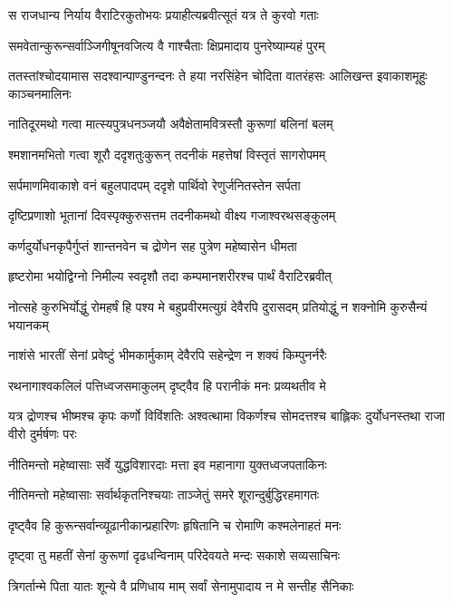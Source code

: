 \twolineshloka
{स राजधान्य निर्याय वैराटिरकुतोभयः}
{प्रयाहीत्यब्रवीत्सूतं यत्र ते कुरवो गताः}


\twolineshloka
{समवेतान्कुरून्सर्वाञ्जिगीषूनवजित्य वै}
{गाश्चैताः क्षिप्रमादाय पुनरेष्याम्यहं पुरम्}


\onelineshloka
{ततस्तांश्चोदयामास सदश्वान्पाण्डुनन्दनः}
\twolineshloka
{ते हया नरसिंहेन चोदिता वातरंहसः}
{आलिखन्त इवाकाशमूहुः काञ्चनमालिनः}


\twolineshloka
{नातिदूरमथो गत्वा मात्स्यपुत्रधनञ्जयौ}
{अवैक्षेतामवित्रस्तौ कुरूणां बलिनां बलम्}


\twolineshloka
{श्मशानमभितो गत्वा शूरौ ददृशतुःकुरून्}
{तदनीकं महत्तेषां विस्तृतं सागरोपमम्}


\twolineshloka
{सर्पमाणमिवाकाशे वनं बहुलपादपम्}
{ददृशे पार्थिवो रेणुर्जनितस्तेन सर्पता}


\twolineshloka
{दृष्टिप्रणाशो भूतानां दिवस्पृक्कुरुसत्तम}
{तदनीकमथो वीक्ष्य गजाश्वरथसङ्कुलम्}


\twolineshloka
{कर्णदुर्योधनकृपैर्गुप्तं शान्तनवेन च}
{द्रोणेन सह पुत्रेण महेष्वासेन धीमता}


\twolineshloka
{हृष्टरोमा भयोद्विग्नो निमील्य स्वदृशौ तदा}
{कम्पमानशरीरश्च पार्थं वैराटिरब्रवीत्}


\threelineshloka
{नोत्सहे कुरुभिर्योद्धुं रोमहर्षं हि पश्य मे}
{बहुप्रवीरमत्युग्रं देवैरपि दुरासदम्}
{प्रतियोद्धुं न शक्नोमि कुरुसैन्यं भयानकम्}


\twolineshloka
{नाशंसे भारतीं सेनां प्रवेष्टुं भीमकार्मुकाम्}
{देवैरपि सहेन्द्रेण न शक्यं किम्पुनर्नरैः}


\twolineshloka
{रथनागाश्वकलिलं पत्तिध्वजसमाकुलम्}
{दृष्ट्वैव हि परानीकं मनः प्रव्यथतीव मे}


\threelineshloka
{यत्र द्रोणश्च भीष्मश्च कृपः कर्णो विविंशतिः}
{अश्वत्थामा विकर्णश्च सोमदत्तश्च बाह्लिकः}
{दुर्योधनस्तथा राजा वीरो दुर्मर्षणः परः}


\twolineshloka
{नीतिमन्तो महेष्वासाः सर्वे युद्धविशारदाः}
{मत्ता इव महानागा युक्तध्वजपताकिनः}


\twolineshloka
{नीतिमन्तो महेष्वासाः सर्वार्थकृतनिश्चयाः}
{ताञ्जेतुं समरे शूरान्दुर्बुद्धिरहमागतः}


\twolineshloka
{दृष्ट्वैव हि कुरून्सर्वान्व्यूढानीकान्प्रहारिणः}
{हृषितानि च रोमाणि कश्मलेनाहतं मनः}



\twolineshloka
{दृष्ट्वा तु महतीं सेनां कुरूणां दृढधन्विनाम्}
{परिदेवयते मन्दः सकाशे सव्यसाचिनः}


\twolineshloka
{त्रिगर्तान्मे पिता यातः शून्ये वै प्रणिधाय माम्}
{सर्वां सेनामुपादाय न मे सन्तीह सैनिकाः}


